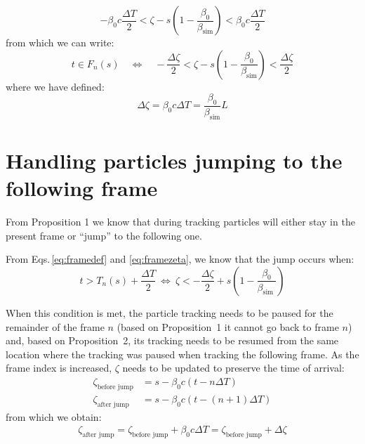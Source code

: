\begin{equation}
-\beta_0 c \frac{\Delta T}{2} < \zeta - s \left(1 -  \frac{\beta_0}{\beta_\text{sim} }\right) < \beta_0 c\frac{\Delta T}{2}
\end{equation}
from which we can write:
\begin{equation}
\boxed{
t \in F_n(s) \quad \Leftrightarrow \quad
-\frac{\Delta \zeta}{2} < \zeta - s \left(1 -  \frac{\beta_0}{\beta_\text{sim} }\right) < \frac{\Delta \zeta}{2}
}
\label{eq:framezeta}
\end{equation}
where we have defined:
\begin{equation}
\boxed{
 \Delta \zeta = \beta_0 c \Delta T = \frac{\beta_0}{\beta_\text{sim}} L
}
\end{equation}

\section{Handling particles jumping to the following frame}

From Proposition 1 we know that during tracking particles will either stay in the present frame or ``jump'' to the following one.

From Eqs.\,\ref{eq:framedef} and \ref{eq:framezeta}, we know that the jump occurs when:
\begin{equation}
t > T_n(s) + \frac{\Delta T}{2}
~
\Leftrightarrow
~
\zeta < -\frac{\Delta \zeta}{2} + s\left(1-\frac{\beta_0}{\beta_{\text {sim }}}\right) 
 \end{equation}
 
When this condition is met, the particle tracking needs to be paused for the remainder of the frame $n$ (based on Proposition~1 it cannot go back to frame $n$) and, based on Proposition~2, its tracking needs to be resumed from the same location where the tracking was paused when tracking the following frame.
As the frame index is increased, $\zeta$ needs to be updated to preserve the time of arrival:
\begin{align}
\zeta_\text{before jump} &= s  - \beta_0 c \left( t - n\Delta T \right) \\
\zeta_\text{after jump} &= s  - \beta_0 c \left( t - (n+1) \Delta T \right)
\end{align}
from which we obtain:
\begin{align}
\boxed{
\zeta_\text{after jump} = \zeta_\text{before jump} + \beta_0 c \Delta T = \zeta_\text{before jump} + \Delta \zeta
}
\end{align}





